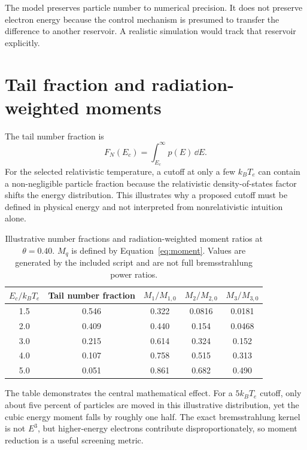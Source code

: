 The model preserves particle number to numerical precision. It does not preserve electron energy because the control mechanism is presumed to transfer the difference to another reservoir. A realistic simulation would track that reservoir explicitly.

\section{Tail fraction and radiation-weighted moments}

The tail number fraction is
\begin{equation}
F_N(E_c)=\int_{E_c}^{\infty}p(E)\,\dd E.
\end{equation}
For the selected relativistic temperature, a cutoff at only a few $k_BT_e$ can contain a non-negligible particle fraction because the relativistic density-of-states factor shifts the energy distribution. This illustrates why a proposed cutoff must be defined in physical energy and not interpreted from nonrelativistic intuition alone.

\begin{table}[H]
\centering
\caption{Illustrative number fractions and radiation-weighted moment ratios at $\theta=0.40$. $M_q$ is defined by Equation~\eqref{eq:moment}. Values are generated by the included script and are not full bremsstrahlung power ratios.}
\label{tab:moment-results}
\begin{tabular}{ccccc}
\toprule
$E_c/k_BT_e$ & Tail number fraction & $M_1/M_{1,0}$ & $M_2/M_{2,0}$ & $M_3/M_{3,0}$ \\
\midrule
1.5 & 0.546 & 0.322 & 0.0816 & 0.0181 \\
2.0 & 0.409 & 0.440 & 0.154 & 0.0468 \\
3.0 & 0.215 & 0.614 & 0.324 & 0.152 \\
4.0 & 0.107 & 0.758 & 0.515 & 0.313 \\
5.0 & 0.051 & 0.861 & 0.682 & 0.490 \\
\bottomrule
\end{tabular}
\end{table}

The table demonstrates the central mathematical effect. For a $5k_BT_e$ cutoff, only about five percent of particles are moved in this illustrative distribution, yet the cubic energy moment falls by roughly one half. The exact bremsstrahlung kernel is not $E^3$, but higher-energy electrons contribute disproportionately, so moment reduction is a useful screening metric.

